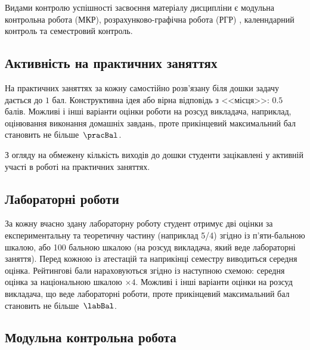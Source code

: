\documentclass{Syllabus}
\begin{document}
%

Видами контролю успішності засвоєння матеріалу дисципліни є  модульна контрольна робота (МКР), розрахунково-графічна робота (РГР) , каленндарний контроль та семестровий контроль.


\subsection*{Активність на практичних заняттях}

На практичних заняттях за кожну самостійно розв’язану біля дошки задачу дається до $1$ бал. Конструктивна ідея або вірна відповідь з <<місця>>: $0.5$ балів. Можливі і інші варіанти оцінки роботи на розсуд викладача, наприклад, оцінювання виконання домашніх завдань, проте прикінцевий максимальний бал становить не більше~$\pracBal$.

З огляду на обмежену кількість виходів до дошки студенти зацікавлені у активній участі в роботі на практичних заняттях.

\subsection*{Лабораторні роботи}

За кожну вчасно здану лабораторну роботу студент отримує дві оцінки за експериментальну та теоретичну частину (наприклад 5/4) згідно із п'яти-бальною шкалою, або 100 бальною шкалою (на розсуд викладача, який веде лабораторні заняття). Перед кожною із атестацій та наприкінці семестру виводиться середня оцінка. Рейтингові бали нараховуються згідно із наступною схемою: середня оцінка за національною шкалою $\times 4$. Можливі і інші варіанти оцінки на розсуд викладача, що веде лабораторні роботи, проте прикінцевий максимальний бал становить не більше~$\labBal$.



\subsection*{Модульна контрольна робота}
\end{document}
